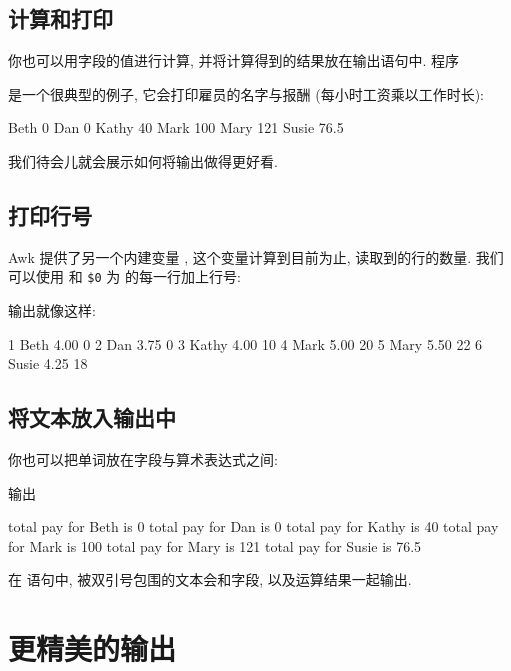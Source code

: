 \subsection{计算和打印}
\label{subsec:computing_and_printing}

你也可以用字段的值进行计算, 并将计算得到的结果放在输出语句中. 程序
是一个很典型的例子, 它会打印雇员的名字与报酬 (每小时工资乘以工作时长):
\begin{file}
    Beth 0
    Dan 0
    Kathy 40
    Mark 100
    Mary 121
    Susie 76.5
\end{file}
我们待会儿就会展示如何将输出做得更好看.

\subsection{打印行号}
\label{subsec:printing_line_numbers}

Awk 提供了另一个内建变量 \nr, 这个变量计算到目前为止, 读取到的行的数量.
我们可以使用 \nr 和 \verb'$0' 为  的每一行加上行号:
输出就像这样:
\begin{file}
    1 Beth    4.00    0
    2 Dan     3.75    0
    3 Kathy   4.00    10
    4 Mark    5.00    20
    5 Mary    5.50    22
    6 Susie   4.25    18
\end{file}

\subsection{将文本放入输出中}
\label{subsec:putting_text_in_the_output}

你也可以把单词放在字段与算术表达式之间:
输出
\begin{file}
    total pay for Beth is 0
    total pay for Dan is 0
    total pay for Kathy is 40
    total pay for Mark is 100
    total pay for Mary is 121
    total pay for Susie is 76.5
\end{file}
在 \print 语句中, 被双引号包围的文本会和字段, 以及运算结果一起输出.

\section{更精美的输出}
\label{sec:fancier_output}

